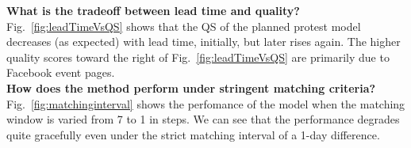 \documentclass[letterpaper]{article}
\begin{document}
\vspace{-1em}
\noindent
{\bf What is the tradeoff between lead time and quality?}
Fig.~\ref{fig:leadTimeVsQS} shows that the QS of the planned protest model decreases (as expected) with lead time, initially, but
later rises again. The higher quality scores toward the right of Fig.~\ref{fig:leadTimeVsQS} are primarily due to
Facebook event pages.\\

\vspace{-1em}
\noindent
{\bf How does the method perform under stringent matching criteria?}
Fig.~\ref{fig:matchinginterval} shows the perfomance of the model when the matching window is varied from 7 to 1 in steps. 
We can see that the performance degrades quite gracefully even under the strict matching interval of a 1-day difference.\\
\end{document}

